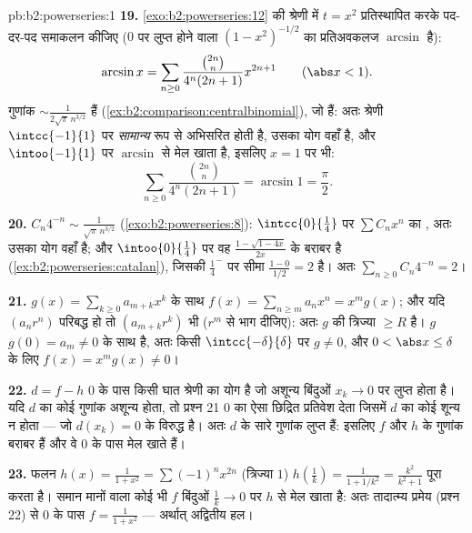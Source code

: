 \begin{solution}{pb:b2:powerseries:1}
\textbf{19.} \cref{exo:b2:powerseries:12} की श्रेणी में $t = x^2$ प्रतिस्थापित करके पद-दर-पद समाकलन
कीजिए ($0$ पर लुप्त होने वाला $(1-x^2)^{-1/2}$ का प्रतिअवकलज $\arcsin$ है):
\[
\arcsin x = \sum_{n\geq0}
\frac{\binom{2n}n}{4^n(2n+1)}x^{2n+1}
\qquad(\abs x < 1) .
\]
गुणांक $\sim \frac{1}{2\sqrt\pi\,n^{3/2}}$ हैं (\cref{ex:b2:comparison:centralbinomial}), जो  हैं: अतः श्रेणी $\intcc{-1}{1}$ पर \emph{सामान्य} रूप
से अभिसरित होती है, उसका योग वहाँ  है, और $\intoo{-1}{1}$ पर  $\arcsin$ से मेल
खाता है, इसलिए $x = 1$ पर भी:
\[
\sum_{n\geq0}\frac{\binom{2n}n}{4^n(2n+1)}
= \arcsin 1 = \frac\pi2 .
\]

\textbf{20.} $C_n4^{-n} \sim \frac{1}{\sqrt\pi\,n^{3/2}}$ (\cref{exo:b2:powerseries:8}): $\intcc{0}{\frac14}$ पर $\sum
C_nx^n$ का , अतः उसका योग वहाँ
 है; और $\intoo{0}{\frac14}$ पर वह
$\frac{1-\sqrt{1-4x}}{2x}$
के बराबर है (\cref{ex:b2:powerseries:catalan}), जिसकी $\frac14^-$ पर सीमा $\frac{1-0}{1/2} = 2$ है। अतः $\sum_{n\geq0}
C_n4^{-n} = 2$।

\textbf{21.} $g(x) = \sum_{k\geq0}a_{m+k}x^k$ के साथ $f(x) = \sum_{n\geq m}a_nx^n = x^m g(x)$; और यदि $(a_nr^n)$ परिबद्ध हो तो $(a_{m+k}r^k)$ भी ($r^m$ से भाग
दीजिए): अतः $g$ की त्रिज्या $\geq
R$ है। $g$ $g(0) = a_m \neq 0$ के साथ  है, अतः किसी $\intcc{-\delta}{\delta}$
पर $g \neq 0$, और $0 < \abs x \leq \delta$ के लिए $f(x) = x^mg(x) \neq 0$।

\textbf{22.} $d = f - h$ $0$ के पास किसी घात श्रेणी का योग है जो अशून्य बिंदुओं
$x_k \to 0$ पर लुप्त होता है। यदि $d$ का कोई गुणांक अशून्य होता, तो प्रश्न 21 $0$
का ऐसा छिद्रित प्रतिवेश देता जिसमें $d$ का कोई शून्य न होता --- जो $d(x_k) = 0$ के
विरुद्ध है। अतः $d$ के सारे गुणांक लुप्त हैं: इसलिए $f$ और $h$ के गुणांक
बराबर हैं और वे $0$ के पास मेल खाते हैं।

\textbf{23.} फलन $h(x) = \frac{1}{1+x^2} =
\sum(-1)^nx^{2n}$ (त्रिज्या $1$) $h(\frac1k) =
\frac{1}{1 + 1/k^2} = \frac{k^2}{k^2+1}$ पूरा करता है। समान मानों वाला कोई
भी  $f$ बिंदुओं $\frac1k \to 0$ पर $h$ से मेल खाता है: अतः तादात्म्य प्रमेय
(प्रश्न 22) से $0$ के पास $f = \frac{1}{1+x^2}$ --- अर्थात् अद्वितीय हल।


\end{solution}
